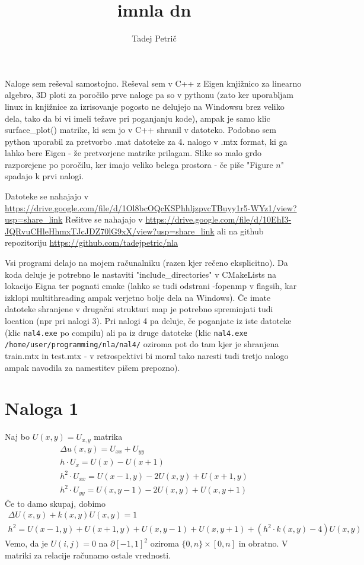 \documentclass{article}
\begin{document}
\author{Tadej Petrič}
\title{imnla dn}
\maketitle
Naloge sem reševal samostojno. Reševal sem v C++ z Eigen knjižnico za linearno algebro, 3D ploti za poročilo prve naloge pa so v pythonu (zato ker uporabljam linux in knjižnice za izrisovanje pogosto ne delujejo na Windowsu brez veliko dela, tako da bi vi imeli težave pri poganjanju kode), ampak je samo klic surface\_plot() matrike, ki sem jo v C++ shranil v datoteko. Podobno sem python uporabil za pretvorbo .mat datoteke za 4. nalogo v .mtx format, ki ga lahko bere Eigen - že pretvorjene matrike prilagam. Slike so malo grdo razporejene po poročilu, ker imajo veliko belega prostora - če piše "Figure \(n\)" spadajo k prvi nalogi.

Datoteke se nahajajo v \url{https://drive.google.com/file/d/1Ol8bcOQcKSPhhljzpvcTBuyy1r5-WYz1/view?usp=share_link}
Rešitve se nahajajo v \url{https://drive.google.com/file/d/10EhI3-JQRvuCHleHhmxTJcJDZ70lG9xX/view?usp=share_link} ali na github repozitoriju \url{https://github.com/tadejpetric/nla}

Vsi programi delajo na mojem računalniku (razen kjer rečeno eksplicitno). Da koda deluje je potrebno le nastaviti "include\_directories" v CMakeLists na lokacijo Eigna ter pognati cmake (lahko se tudi odstrani -fopenmp v flagsih, kar izklopi multithreading ampak verjetno bolje dela na Windows). Če imate datoteke shranjene v drugačni strukturi map je potrebno spreminjati tudi location (npr pri nalogi 3). Pri nalogi 4 pa deluje, če poganjate iz iste datoteke (klic \verb|nal4.exe| po compilu) ali pa iz druge datoteke (klic \verb|nal4.exe /home/user/programming/nla/nal4/| oziroma pot do tam kjer je shranjena train.mtx in test.mtx - v retrospektivi bi moral tako naresti tudi tretjo nalogo ampak navodila za namestitev pišem prepozno).

\section{Naloga 1}
    Naj bo \(U(x,y) = U_{x,y}\) matrika
    \begin{align*}
        \Delta u(x,y) = U_{xx} + U_{yy}\\
        h\cdot U_x = U(x) - U(x+1)\\
        h^2\cdot U_{xx} = U(x-1, y) - 2U(x,y) + U(x+1,y)\\
        h^2\cdot U_{yy} = U(x, y-1) - 2U(x,y) + U(x, y+1)
    \end{align*}
    Če to damo skupaj, dobimo
    \begin{align*}
        \Delta U(x,y) + k(x,y)U(x,y) = 1\\
        h^2 = U(x-1,y)+U(x+1,y)+U(x,y-1)+U(x,y+1) + (h^2\cdot k(x,y)- 4) U(x,y)
    \end{align*}
    Vemo, da je \(U(i,j)=0\) na \(\partial [-1,1]^2\) oziroma \(\{0,n\}\times [0,n]\) in obratno. V matriki za relacije računamo ostale vrednosti.
    
\end{document}
